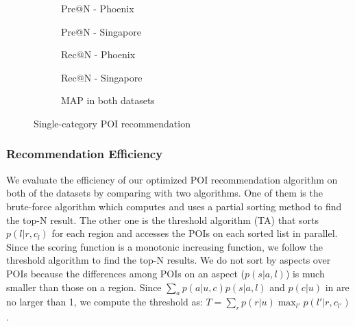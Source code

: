 \begin{figure*}[th]
\begin{subfigure}[t]{0.4\columnwidth}
\centering
{}
\caption{Pre@N - Phoenix}
\end{subfigure}
\begin{subfigure}[t]{0.4\columnwidth}
\centering
{}
\caption{Pre@N - Singapore}
\end{subfigure}
\begin{subfigure}[t]{0.4\columnwidth}
\centering
{}
\caption{Rec@N - Phoenix}
\end{subfigure}
\begin{subfigure}[t]{0.4\columnwidth}
\centering
{}
\caption{Rec@N - Singapore}
\end{subfigure}
\begin{subfigure}[t]{0.4\columnwidth}
\centering
{}
\caption{MAP in both datasets}
\end{subfigure}
\caption{Single-category POI recommendation}
\label{fig:poic}
\end{figure*}

\subsubsection{Recommendation Efficiency}
We evaluate the efficiency of our optimized POI recommendation algorithm
on both of the datasets by comparing with two algorithms. One of them is the brute-force
algorithm which computes  and uses a partial sorting method to find
the top-N result. The other one is the threshold algorithm (TA) \cite{FaginTA:2001} that sorts $p(l|r,c_l)$ for each region
and accesses the POIs on each sorted list in parallel. Since the scoring function is a monotonic increasing
function, we follow the threshold algorithm to find the top-N results. We do not sort by aspects
over POIs because the differences among POIs on an aspect ($p(s|a,l)$) is much smaller than those on a region.
Since $\sum_{a}{p(a|u,c)p(s|a,l)}$ and $p(c|u)$ in  are no larger than 1,
we compute the threshold as: $T=\sum_{r}p(r|u)\max_{l'}{p(l'|r,c_{l'})}$.

